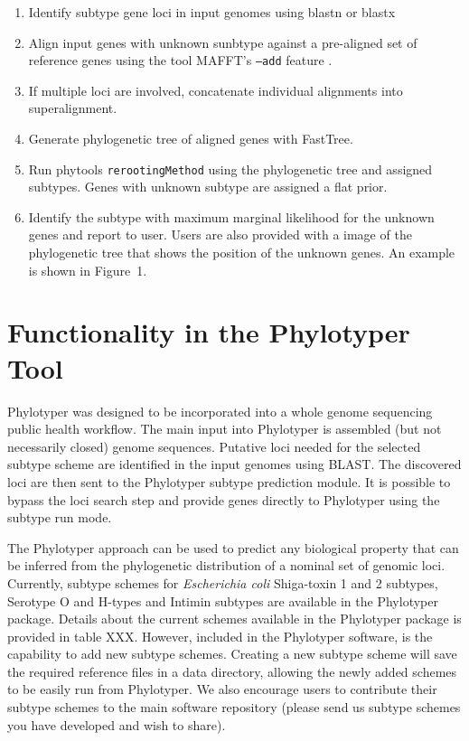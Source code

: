 \documentclass{bioinfo}
\begin{document}
\begin{enumerate}
\item Identify subtype gene loci in input genomes using blastn or blastx %
\item Align input genes with unknown sunbtype against a pre-aligned set of reference genes using the tool MAFFT's \texttt{--add} feature \citep{Katoh2013}.
\item If multiple loci are involved, concatenate individual alignments into superalignment.
\item Generate phylogenetic tree of aligned genes with FastTree.
\item Run phytools \texttt{rerootingMethod} using the phylogenetic tree and assigned subtypes. 
Genes with unknown subtype are assigned a flat prior.
\item Identify the subtype with maximum marginal likelihood for the unknown genes and report to user.
Users are also provided with a image of the phylogenetic tree that shows the position of the unknown genes. 
An example is shown in Figure~1\vphantom{\ref{fig:01}}.
\end{enumerate}


\section{Functionality in the Phylotyper Tool}

Phylotyper was designed to be incorporated into a whole genome sequencing public health workflow.  
The main input into Phylotyper is assembled (but not necessarily closed) genome sequences.  
Putative loci needed for the selected subtype scheme are identified in the input genomes using BLAST.
The discovered loci are then sent to the Phylotyper subtype prediction module.
It is possible to bypass the loci search step and provide genes directly to Phylotyper using the subtype run mode.

The Phylotyper approach can be used to predict any biological property that can be inferred from the phylogenetic distribution of a nominal set of genomic loci.
Currently, subtype schemes for \emph{Escherichia coli} Shiga-toxin 1 and 2 subtypes, Serotype O and H-types and Intimin subtypes are available in the Phylotyper package.
Details about the current schemes available in the Phylotyper package is provided in table XXX.
However, included in the Phylotyper software, is the capability to add new subtype schemes. 
Creating a new subtype scheme will save the required reference files in a data directory, allowing the newly added schemes to be easily run from Phylotyper. 
We also encourage users to contribute their subtype schemes to the main software repository (please send us subtype schemes you have developed and wish to share).
\end{document}
